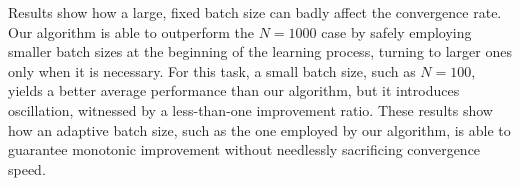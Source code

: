 Results show how a large, fixed batch size can badly affect the convergence rate. Our algorithm is able to outperform the $N=1000$ case by safely employing smaller batch sizes at the beginning of the learning process, turning to larger ones only when it is necessary.
For this task, a small batch size, such as $N=100$, yields a better average performance than our algorithm, but it introduces oscillation, witnessed by a less-than-one improvement ratio.
These results show how an adaptive batch size, such as the one employed by our algorithm, is able to guarantee monotonic improvement without needlessly sacrificing convergence speed.